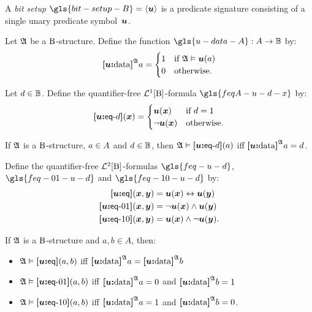 A \emph{bit setup} $\gls{bit-setup-B} = \seq{\su}$ is a predicate signature
consisting of a single unary predicate symbol~$\su$.

\begin{definition}
Let $\StrA$ be a $\BS$-structure.
Define the function $\gls{u-data-A} : \domA \to \Bits$ by:
\[
  \data\su\StrA a = \begin{cases}
    1 &\text{if } \StrA \vDash \su(a) \\
    0 &\text{otherwise.}
  \end{cases}
\]
\end{definition}
\begin{definition}
Let $\datad \in \Bits$. Define the quantifier-free $\vFoF1\BS$-formula
$\gls{feqA-u-d-x}$ by:
\[
  \feqA\su\datad(\xx) = \begin{cases}
    \su(\xx) &\text{if } \datad = 1 \\
    \lnot\su(\xx) &\text{otherwise.}
  \end{cases}
\]
\end{definition}

\begin{remark}
If $\StrA$ is a $\BS$-structure, $\ea \in \domA$ and $\datad \in \Bits$,
then $\StrA \vDash \feqA\su\datad(\ea)$ iff $\data\su\StrA\ea = \datad$.
\end{remark}

\begin{definition}
Define the quantifier-free $\vFoF2\BS$-formulas 
$\gls{feq-u-d}$, $\gls{feq-01-u-d}$ and $\gls{feq-10-u-d}$ by:
\begin{align*}
  \feq\su(\xx,\yy) &= \su(\xx) \lequ \su(\yy) \\
  \feqOI\su(\xx,\yy) &= \lnot \su(\xx) \land \su(\yy) \\
  \feqIO\su(\xx,\yy) &= \su(\xx) \land \lnot \su(\yy). \\
\end{align*}
\end{definition}

\begin{remark}
If $\StrA$ is a $\BS$-structure and $a, b \in A$, then:
\begin{itemize}
  \item $\StrA \vDash \feq\su(a, b)$ iff $\data\su\StrA a = \data\su\StrA b$
  \item $\StrA \vDash \feqOI\su(a, b)$ iff $\data\su\StrA a = 0$ and
  $\data\su\StrA b = 1$
  \item $\StrA \vDash \feqIO\su(a, b)$ iff $\data\su\StrA a = 1$ and
  $\data\su\StrA b = 0$.
\end{itemize}
\end{remark}